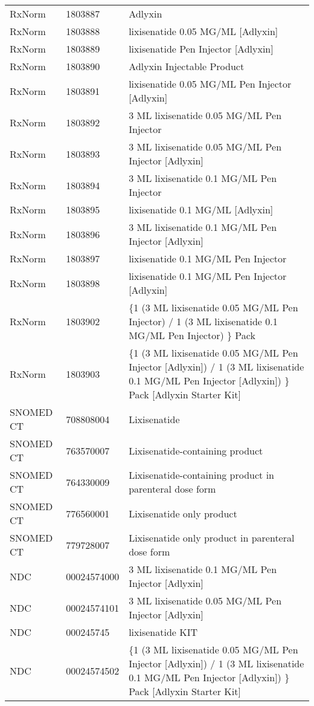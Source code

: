 \begin{longtable}{p{}p{}p{}}
  RxNorm & 1803887 & Adlyxin \\ 
  RxNorm & 1803888 & lixisenatide 0.05 MG/ML [Adlyxin] \\ 
  RxNorm & 1803889 & lixisenatide Pen Injector [Adlyxin] \\ 
  RxNorm & 1803890 & Adlyxin Injectable Product \\ 
  RxNorm & 1803891 & lixisenatide 0.05 MG/ML Pen Injector [Adlyxin] \\ 
  RxNorm & 1803892 & 3 ML lixisenatide 0.05 MG/ML Pen Injector \\ 
  RxNorm & 1803893 & 3 ML lixisenatide 0.05 MG/ML Pen Injector [Adlyxin] \\ 
  RxNorm & 1803894 & 3 ML lixisenatide 0.1 MG/ML Pen Injector \\ 
  RxNorm & 1803895 & lixisenatide 0.1 MG/ML [Adlyxin] \\ 
  RxNorm & 1803896 & 3 ML lixisenatide 0.1 MG/ML Pen Injector [Adlyxin] \\ 
  RxNorm & 1803897 & lixisenatide 0.1 MG/ML Pen Injector \\ 
  RxNorm & 1803898 & lixisenatide 0.1 MG/ML Pen Injector [Adlyxin] \\ 
  RxNorm & 1803902 & \{1 (3 ML lixisenatide 0.05 MG/ML Pen Injector) / 1 (3 ML lixisenatide 0.1 MG/ML Pen Injector) \} Pack \\ 
  RxNorm & 1803903 & \{1 (3 ML lixisenatide 0.05 MG/ML Pen Injector [Adlyxin]) / 1 (3 ML lixisenatide 0.1 MG/ML Pen Injector [Adlyxin]) \} Pack [Adlyxin Starter Kit] \\ 
  SNOMED CT & 708808004 & Lixisenatide \\ 
  SNOMED CT & 763570007 & Lixisenatide-containing product \\ 
  SNOMED CT & 764330009 & Lixisenatide-containing product in parenteral dose form \\ 
  SNOMED CT & 776560001 & Lixisenatide only product \\ 
  SNOMED CT & 779728007 & Lixisenatide only product in parenteral dose form \\ 
  NDC & 00024574000 & 3 ML lixisenatide 0.1 MG/ML Pen Injector [Adlyxin] \\ 
  NDC & 00024574101 & 3 ML lixisenatide 0.05 MG/ML Pen Injector [Adlyxin] \\ 
  NDC & 000245745 & lixisenatide KIT \\ 
  NDC & 00024574502 & \{1 (3 ML lixisenatide 0.05 MG/ML Pen Injector [Adlyxin]) / 1 (3 ML lixisenatide 0.1 MG/ML Pen Injector [Adlyxin]) \} Pack [Adlyxin Starter Kit] \\ 

\end{longtable}

